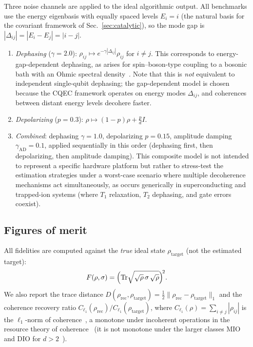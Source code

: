 \documentclass[pra,twocolumn,superscriptaddress,longbibliography,floatfix,nofootinbib]{revtex4-2}
\newcommand{\tr}{\mathrm{Tr}}
\newcommand{\rhot}{\rho_\mathrm{target}}
\newcommand{\rhor}{\rho_\mathrm{rec}}
\begin{document}
Three noise channels are applied to the ideal algorithmic output.
All benchmarks use the energy eigenbasis with equally spaced levels $E_i = i$ (the natural basis for the covariant framework of Sec.~\ref{sec:catalytic}), so the mode gap is $|\Delta_{ij}| = |E_i - E_j| = |i - j|$.
\begin{enumerate}
\item \emph{Dephasing} ($\gamma = 2.0$): $\rho_{ij} \mapsto e^{-\gamma|\Delta_{ij}|}\rho_{ij}$ for $i \neq j$.
This corresponds to energy-gap-dependent dephasing, as arises for spin--boson-type coupling to a bosonic bath with an Ohmic spectral density~\cite{Leggett1987,BreuerPetruccione2002}.
Note that this is \emph{not} equivalent to independent single-qubit dephasing; the gap-dependent model is chosen because the CQEC framework operates on energy modes $\Delta_{ij}$, and coherences between distant energy levels decohere faster.
\item \emph{Depolarizing} ($p = 0.3$): $\rho \mapsto (1-p)\rho + \frac{p}{d}I$.
\item \emph{Combined}: dephasing $\gamma = 1.0$, depolarizing $p = 0.15$, amplitude damping $\gamma_\mathrm{AD} = 0.1$, applied sequentially in this order (dephasing first, then depolarizing, then amplitude damping).
This composite model is not intended to represent a specific hardware platform but rather to stress-test the estimation strategies under a worst-case scenario where multiple decoherence mechanisms act simultaneously, as occurs generically in superconducting and trapped-ion systems (where $T_1$ relaxation, $T_2$ dephasing, and gate errors coexist).
\end{enumerate}

\subsection{Figures of merit}
\label{sec:figures_merit}

All fidelities are computed against the \emph{true} ideal state $\rhot$ (not the estimated target):
\begin{equation}
F(\rho,\sigma) = \Bigl(\tr\sqrt{\sqrt{\rho}\,\sigma\,\sqrt{\rho}}\Bigr)^{\!2}.
\label{eq:fidelity}
\end{equation}
We also report the trace distance $D(\rhor, \rhot) = \frac{1}{2}\|\rhor - \rhot\|_1$ and the coherence recovery ratio $C_{\ell_1}(\rhor)/C_{\ell_1}(\rhot)$, where $C_{\ell_1}(\rho) = \sum_{i \neq j} |\rho_{ij}|$ is the $\ell_1$-norm of coherence~\cite{Baumgratz2014}, a monotone under incoherent operations in the resource theory of coherence~\cite{Streltsov2017} (it is not monotone under the larger classes MIO and DIO for $d > 2$~\cite{Streltsov2017}).
\end{document}
